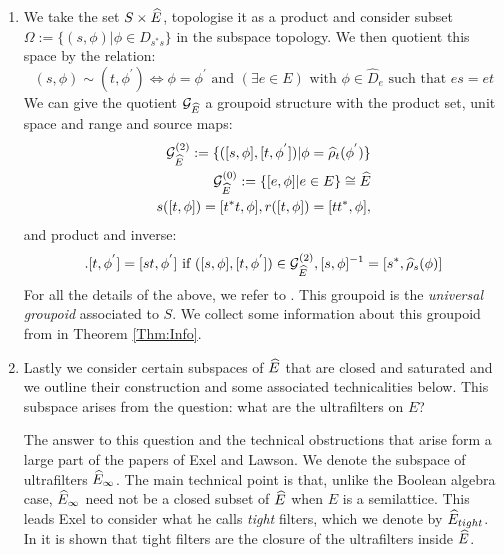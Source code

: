 \begin{example}
\begin{definition}
\begin{enumerate}
\item We take the set $S \times \widehat{E}$, topologise it as a product and consider subset $\Omega:= \lbrace (s, \phi) | \phi \in D_{s^{*}s} \rbrace$ in the subspace topology. We then quotient this space by the relation:
\begin{equation*}
(s, \phi) \sim (t, \phi^{'}) \Leftrightarrow \phi=\phi^{'} \mbox{ and } (\exists e \in E) \mbox{ with } \phi \in \widehat{D}_{e} \mbox{ such that } es=et
\end{equation*}
We can give the quotient $\mathcal{G}_{\widehat{E}}$ a groupoid structure with the product set, unit space and range and source maps:
\begin{eqnarray*}
\mathcal{G}_{\widehat{E}}^{(2)}:=\lbrace ([s,\phi],[t,\phi^{'}]) | \phi=\widehat{\rho}_{t}(\phi^{'}) \rbrace \\
\mathcal{G}_{\widehat{E}}^{(0)}:= \lbrace [e,\phi] | e \in E \rbrace \cong \widehat{E} \\
s([t,\phi])=[t^{*}t,\phi], r([t,\phi])=[tt^{*},\phi], 
\end{eqnarray*}
and product and inverse:
\begin{eqnarray*}
[s,\phi].[t,\phi^{'}]= [st,\phi^{'}] \mbox{ if } ([s,\phi],[t,\phi^{'}]) \in \G_{\E}^{(2)}, [s,\phi]^{-1} = [s^{*},\widehat{\rho}_{s}(\phi)] 
\end{eqnarray*}
For all the details of the above, we refer to \cite[Section 4]{MR2419901}. This groupoid is the \textit{universal groupoid} associated to $S$. We collect some information about this groupoid from \cite{MR2419901,MR1724106} in Theorem \ref{Thm:Info}.
\item Lastly we consider certain subspaces of $\widehat{E}$ that are closed and saturated and we outline their construction and some associated technicalities below. This subspace arises from the question: what are the ultrafilters on $E$?

The answer to this question and the technical obstructions that arise form a large part of the papers \cite{MR2419901,MR2672179} of Exel and Lawson. We denote the subspace of ultrafilters $\widehat{E}_{\infty}$. The main technical point is that, unlike the Boolean algebra case, $\widehat{E}_{\infty}$ need not be a closed subset of $\widehat{E}$ when $E$ is a semilattice. This leads Exel to consider what he calls \textit{tight} filters, which we denote by $\widehat{E}_{tight}$. In \cite{MR2419901} it is shown that tight filters are the closure of the ultrafilters inside $\widehat{E}$. 

\end{enumerate}
\end{definition}


\end{example}
